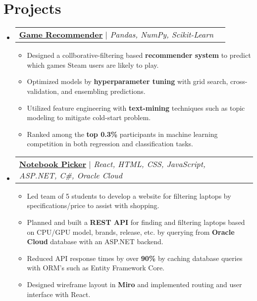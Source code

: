 \documentclass[letterpaper, 10pt]{article}
\makeatletter
\newcommand{\resumeItem}[1]{
  \item\small{
    {#1 \vspace{-2pt}}
  }
}
\newcommand{\resumeProjectHeading}[2]{
    \vspace{4pt}\item
    \begin{tabular*}{0.97\textwidth}{l@{\extracolsep{\fill}}r}
      \small#1 & #2 \\
    \end{tabular*}\vspace{-7pt}
}
\newcommand{\resumeSubHeadingListStart}{\begin{itemize}[leftmargin=0.15in, label={}]}
\newcommand{\resumeSubHeadingListEnd}{\end{itemize}}
\newcommand{\resumeItemListStart}{\begin{itemize}}
\newcommand{\resumeItemListEnd}{\end{itemize}\vspace{-4pt}}
\makeatother
\begin{document}
\section{Projects}
    \resumeSubHeadingListStart
      \resumeProjectHeading
          {\href{}{\underline{\textbf{Game Recommender}}} $|$ \emph{Pandas, NumPy, Scikit-Learn}}{}
          \resumeItemListStart
            \resumeItem{Designed a collborative-filtering based \textbf{recommender system} to predict which games Steam users are likely to play. }
            \resumeItem{Optimized models by \textbf{hyperparameter tuning} with grid search, cross-validation, and ensembling predictions. }
            \resumeItem{Utilized feature engineering with \textbf{text-mining} techniques such as topic modeling to mitigate cold-start problem.}
            \resumeItem{Ranked among the \textbf{top 0.3\%} participants in machine learning competition in both regression and classification tasks.}
          \resumeItemListEnd
      \resumeProjectHeading
          {\href{https://github.com/benjxia/notebookpicker}{\underline{\textbf{Notebook Picker}}} $|$ \emph{React, HTML, CSS, JavaScript, ASP.NET, C\#, Oracle Cloud}}{}
          \resumeItemListStart
            \resumeItem{Led team of 5 students to develop a website for filtering laptops by specifications/price to assist with shopping.}
            \resumeItem{Planned and built a \textbf{REST API} for finding and filtering laptops based on CPU/GPU model, brands, release, etc. by querying from \textbf{Oracle Cloud} database with an ASP.NET backend.}
            \resumeItem{Reduced API response times by over \textbf{90\%} by caching database queries with ORM's such as Entity Framework Core.}
            \resumeItem{Designed wireframe layout in \textbf{Miro} and implemented routing and user interface with React.}
          \resumeItemListEnd
    \resumeSubHeadingListEnd



\end{document}
